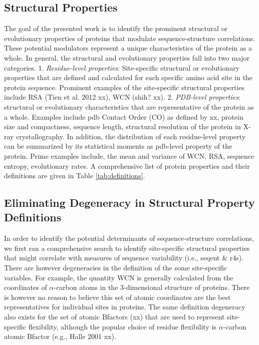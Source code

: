 \documentclass[12pt]{article}
\begin{document}
    \subsection*{Structural Properties}

    The goal of the presented work is to identify the prominent structural or evolutionary properties of proteins that modulate sequence-structure correlations. These potential modulators represent a unique characteristics of the protein as a whole.  In general, the structural and evolutionary properties fall into two major categories.  1. {\it Residue-level properties}: Site-specific structural or evolutionary properties that are defined and calculated for each specific amino acid site in the protein sequence. Prominent examples of the site-specific structural properties include RSA {\color{red}(Tien et al. 2012 xx),} WCN {\color{red}(shih? xx)}.   2. {\it PDB-level properties}: structural or evolutionary characteristics that are representative of the protein as a whole. Examples include pdb Contact Order (CO) as defined by {\color{red}xx}, protein size and compactness, sequence length, structural resolution of the protein in X-ray crystallography.  In addition, the distribution of each residue-level property can be summarized by its statistical moments as pdb-level property of the protein. Prime examples include, the mean and variance of WCN, RSA, sequence entropy, evolutionary rates. A comprehensive list of protein properties and their definitions are given in Table \ref{tab:definitions}.

    \subsection*{Eliminating Degeneracy in Structural Property Definitions}

    In order to identify the potential determinants of sequence-structure correlations, we first ran a comprehensive search to identify site-specific structural properties that might correlate with measures of sequence variability (i.e., seqent \& r4s). There are however degeneracies in the definition of the some site-specific variables. For example, the quantity WCN is generally calculated from the coordinates of $\alpha$-carbon atoms in the 3-dimensional structure of proteins. There is however no reason to believe this set of atomic coordinates are the best representatives for individual sites in proteins. The same definition degeneracy also exists for the set of atomic Bfactors {\color{red}(xx)} that are used to represent site-specific flexibility, although the popular choice of residue flexibility is $\alpha$-carbon atomic Bfactor {\color{red}(e.g., Halle 2001 xx)}.
    \\
\end{document}
